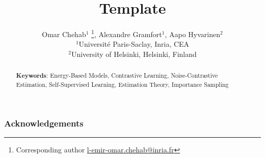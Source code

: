 \documentclass[11pt]{article}
\begin{document}
\title{Template}
\date{}

\author{
    Omar Chehab$^{1}$
    \footnote{
    Corresponding author \href{mailto:l-emir-omar.chehab@inria.fr}{l-emir-omar.chehab@inria.fr}},
    {Alexandre Gramfort}$^1$,
    {Aapo Hyvarinen}$^{2}$ \\ [.8em]
    $^1${Universit\'e Paris-Saclay, Inria, CEA} \\
    $^2$University of Helsinki, Helsinki, Finland \\
}

\maketitle

\begin{abstract}
    
    \noindent \textbf{Keywords}:
    Energy-Based Models, Contrastive Learning, Noise-Contrastive Estimation, Self-Supervised Learning, Estimation Theory, Importance Sampling
\end{abstract}











\subsubsection*{Acknowledgements}



\vskip 0.2in



\newpage



\newpage

\end{document}
